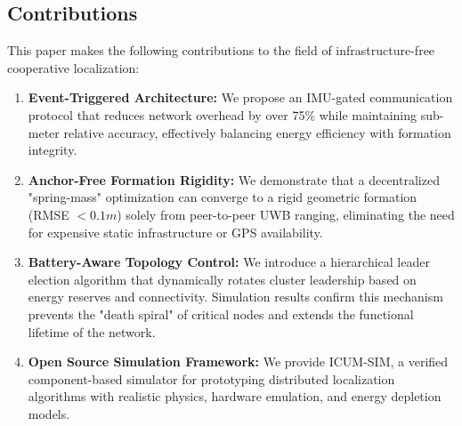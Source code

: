 \subsection*{Contributions}
\noindent This paper makes the following contributions to the field of infrastructure-free cooperative localization:
\begin{enumerate}
    \item \textbf{Event-Triggered Architecture:} We propose an IMU-gated communication protocol that reduces network overhead by over 75\% while maintaining sub-meter relative accuracy, effectively balancing energy efficiency with formation integrity.
    \item \textbf{Anchor-Free Formation Rigidity:} We demonstrate that a decentralized "spring-mass" optimization can converge to a rigid geometric formation (RMSE $< 0.1m$) solely from peer-to-peer UWB ranging, eliminating the need for expensive static infrastructure or GPS availability.
    \item \textbf{Battery-Aware Topology Control:} We introduce a hierarchical leader election algorithm that dynamically rotates cluster leadership based on energy reserves and connectivity.  Simulation results confirm this mechanism prevents the "death spiral" of critical nodes and extends the functional lifetime of the network.
    \item \textbf{Open Source Simulation Framework:} We provide ICUM-SIM, a verified component-based simulator for prototyping distributed localization algorithms with realistic physics, hardware emulation, and energy depletion models.
\end{enumerate}








